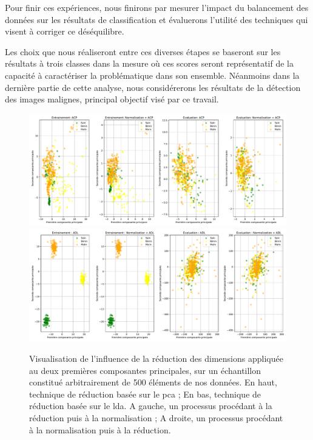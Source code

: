 Pour finir ces expériences, nous finirons par mesurer l'impact du balancement des données sur les résultats de classification et évaluerons l'utilité des techniques qui visent à corriger ce déséquilibre.\par

Les choix que nous réaliseront entre ces diverses étapes se baseront sur les résultats à trois classes dans la mesure où ces scores seront représentatif de la capacité à caractériser la problématique dans son ensemble. Néanmoins dans la dernière partie de cette analyse, nous considérerons les résultats de la détection des images malignes, principal objectif visé par ce travail.\par

\addtocounter{footnote}{1}
 
\begin{figure}[H]
    \centering
    \includegraphics[width=\linewidth]{contents/chapter_4/resources/visualisation_scaling_PCA.pdf}
    \includegraphics[width=\linewidth]{contents/chapter_4/resources/visualisation_scaling_LDA.pdf}
    \caption{Visualisation de l'influence de la réduction des dimensions appliquée au deux premières composantes principales, sur un échantillon constitué arbitrairement de 500 éléments de nos données. En haut, technique de réduction basée sur le \gls{pca} ; En bas, technique de réduction basée sur le \gls{lda}. A gauche, un processus procédant à la réduction puis à la normalisation ; A droite, un processus procédant à la normalisation puis à la réduction.}
    \label{fig:visualisation_scaling_reduction}
\end{figure}\par


